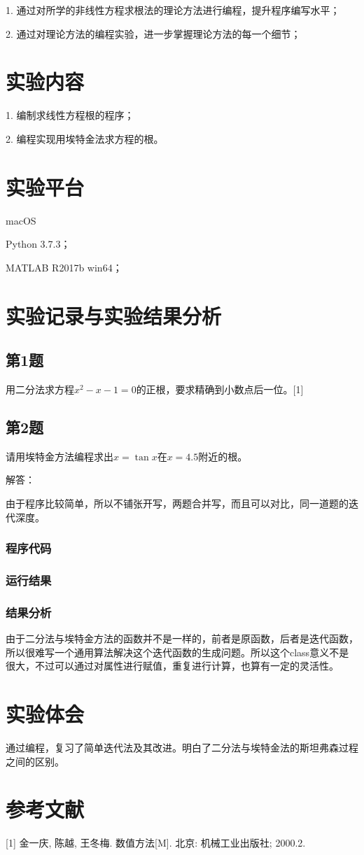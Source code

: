 1. 通过对所学的非线性方程求根法的理论方法进行编程，提升程序编写水平；

2. 通过对理论方法的编程实验，进一步掌握理论方法的每一个细节；

\section{实验内容}

1. 编制求线性方程根的程序；

2. 编程实现用埃特金法求方程的根。

\section{实验平台}

macOS

Python 3.7.3；

MATLAB R2017b win64；

\section{实验记录与实验结果分析}

\subsection{第1题}

用二分法求方程$x^2-x-1=0$的正根，要求精确到小数点后一位。[1]

\subsection{第2题}

请用埃特金方法编程求出$x=\tan⁡x$在$x=4.5$附近的根。

解答：

由于程序比较简单，所以不铺张开写，两题合并写，而且可以对比，同一道题的迭代深度。
\subsubsection{程序代码}



\subsubsection{运行结果}

\subsubsection{结果分析}

由于二分法与埃特金方法的函数并不是一样的，前者是原函数，后者是迭代函数，所以很难写一个通用算法解决这个迭代函数的生成问题。所以这个class意义不是很大，不过可以通过对属性进行赋值，重复进行计算，也算有一定的灵活性。

\section{实验体会}

通过编程，复习了简单迭代法及其改进。明白了二分法与埃特金法的斯坦弗森过程之间的区别。

\section{参考文献}

[1] 金一庆, 陈越, 王冬梅. 数值方法[M]. 北京: 机械工业出版社; 2000.2.
